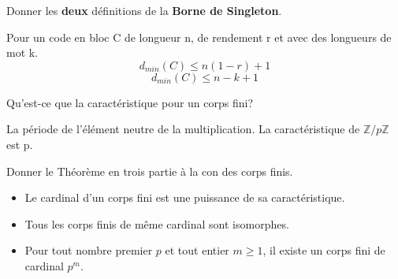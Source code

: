 \documentclass[12pt]{article}
\newcommand*{\xfield}[1]{\begin{mdframed}\centering #1\end{mdframed}\bigskip}
\newenvironment{note}{}{}
\begin{document}
\begin{note}
\xfield{Donner les \textbf{deux} définitions de la \textbf{Borne de Singleton}. }
\xfield{
Pour un code en bloc C de longueur n, de rendement r et avec des longueurs de mot k.
$$d_{min}(C) \leq n(1-r) + 1$$
$$d_{min}(C) \leq n-k+1$$
}
\end{note}

\begin{note}
\xfield{Qu'est-ce que la caractéristique pour un corps fini?}
\xfield{La période de l'élément neutre de la multiplication. La caractéristique de ${\mathbb{Z}}/{p\mathbb{Z}}$ est p.}
\end{note}

\begin{note}
\xfield{Donner le Théorème en trois partie à la con des corps finis.}
\xfield{
\begin{itemize}
\item Le cardinal d'un corps fini est une puissance de sa caractéristique.
\item Tous les corps finis de même cardinal sont isomorphes.
\item Pour tout nombre premier $p$ et tout entier $m \geq 1$, il existe un corps fini de  cardinal $p^m$.
\end{itemize}
}
\end{note}
\end{document}
